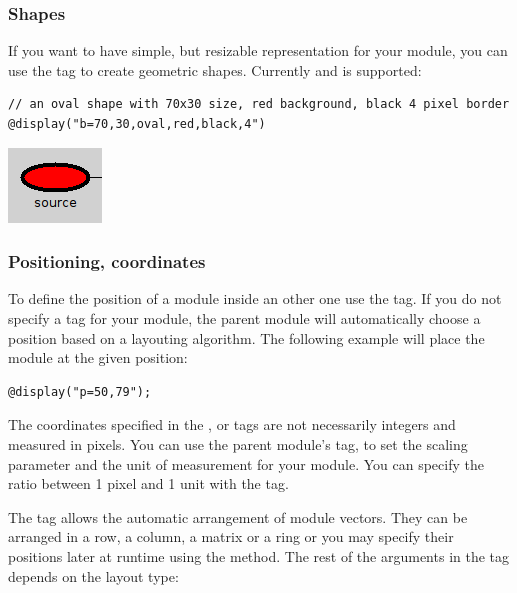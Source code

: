 \subsubsection{Shapes}
If you want to have simple, but resizable representation for your module, you can use
the  tag to create geometric shapes. Currently  and 
 is supported:
\begin{verbatim}
// an oval shape with 70x30 size, red background, black 4 pixel border
@display("b=70,30,oval,red,black,4")
\end{verbatim}

\begin{center}
\includegraphics{figures/graphics-btag}
\end{center}

\subsubsection{Positioning, coordinates}

To define the position of a module inside an other one use the  tag.
If you do not specify a  tag for your module, the parent module will
automatically choose a position based on a layouting algorithm.
The following example will place the module at the given position:
\begin{verbatim}
@display("p=50,79");
\end{verbatim}

\begin{note}
The coordinates specified in the ,  or  tags are not necessarily
integers and measured in pixels. You can use the parent module's  tag,
to set the scaling parameter and the unit of measurement for your module.
You can specify the ratio between 1 pixel and 1 unit with the  tag.
\end{note}

The  tag allows the automatic arrangement of module vectors. They can be
arranged in a row, a column, a matrix or a ring or you may specify their positions
later at runtime using the  method. The rest of the arguments
in the  tag depends on the layout type:


